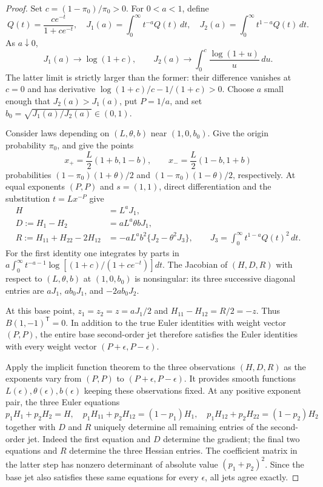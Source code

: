 \documentclass[11pt,letterpaper]{article}
\theoremstyle{definition}
\theoremstyle{remark}
\newcommand{\1}{\mathbf 1}
\begin{document}
\begin{proof}
Set $c=(1-\pi_0)/\pi_0>0$.  For $0<a<1$, define
\[
 Q(t)=\frac{ce^{-t}}{1+ce^{-t}},\quad
 J_1(a)=\int_0^\infty t^{-a}Q(t)\,dt,\quad
 J_2(a)=\int_0^\infty t^{1-a}Q(t)\,dt.
\]
As $a\downarrow0$,
\[
 J_1(a)\longrightarrow\log(1+c),\qquad
 J_2(a)\longrightarrow\int_0^c\frac{\log(1+u)}{u}\,du.
\]
The latter limit is strictly larger than the former: their difference
vanishes at $c=0$ and has derivative
$\log(1+c)/c-1/(1+c)>0$.  Choose $a$ small enough that $J_2(a)>J_1(a)$,
put $P=1/a$, and set $b_0=\sqrt{J_1(a)/J_2(a)}\in(0,1)$.

Consider laws depending on $(L,\theta,b)$ near $(1,0,b_0)$.
Give the origin probability $\pi_0$, and give the points
\[
 x_+=\frac L2(1+b,1-b),\qquad
 x_-=\frac L2(1-b,1+b)
\]
probabilities $(1-\pi_0)(1+\theta)/2$ and
$(1-\pi_0)(1-\theta)/2$, respectively.  At equal exponents $(P,P)$
and $s=(1,1)$, direct differentiation and the substitution
$t=Lx^{-P}$ give
\begin{align*}
 H&=L^aJ_1,\\
 D:=H_1-H_2&=aL^a\theta bJ_1,\\
 R:=H_{11}+H_{22}-2H_{12}
 &=-aL^ab^2\{J_2-\theta^2J_3\},
 \qquad J_3=\int_0^\infty t^{1-a}Q(t)^2\,dt.
\end{align*}
For the first identity one integrates by parts in
$a\int_0^\infty t^{-a-1}\log[(1+c)/(1+ce^{-t})]dt$.
The Jacobian of $(H,D,R)$ with respect to $(L,\theta,b)$ at
$(1,0,b_0)$ is nonsingular: its three successive diagonal entries
are $aJ_1$, $ab_0J_1$, and $-2ab_0J_2$.

At this base point, $z_1=z_2=z=aJ_1/2$ and
$H_{11}-H_{12}=R/2=-z$.  Thus $B(1,-1)^{\mathsf T}=0$.
In addition to the true Euler identities with weight vector $(P,P)$,
the entire base second-order jet therefore satisfies the Euler
identities with every weight vector $(P+\epsilon,P-\epsilon)$.

Apply the implicit function theorem to the three observations
$(H,D,R)$ as the exponents vary from $(P,P)$ to
$(P+\epsilon,P-\epsilon)$.  It provides smooth functions
$L(\epsilon),\theta(\epsilon),b(\epsilon)$ keeping these observations
fixed.  At any positive exponent pair, the three Euler equations
\[
 p_1H_1+p_2H_2=H,\quad
 p_1H_{11}+p_2H_{12}=(1-p_1)H_1,\quad
 p_1H_{12}+p_2H_{22}=(1-p_2)H_2
\]
together with $D$ and $R$ uniquely determine all remaining entries
of the second-order jet.  Indeed the first equation and $D$ determine
the gradient; the final two equations and $R$ determine the three
Hessian entries.  The coefficient matrix in the latter step has
nonzero determinant of absolute value $(p_1+p_2)^2$.  Since the base
jet also satisfies these same equations for every $\epsilon$, all
jets agree exactly.


\end{proof}
\end{document}
